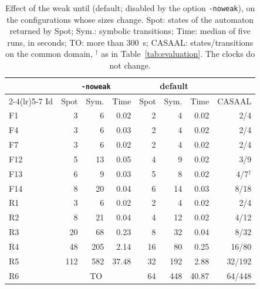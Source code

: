 \begin{table}[t]
\centering
\caption{Effect of the weak until (default; disabled by the option \texttt{-noweak}), on the configurations whose sizes change.  Spot: states of the automaton returned by Spot; Sym.: symbolic transitions; Time: median of five runs, in seconds; TO: more than 300~s; CASAAL: states/transitions on the common domain, $^\dagger$ as in Table~\ref{tab:evaluation}.  The clocks do not change.}
\label{tab:weak}
\footnotesize
\setlength{\tabcolsep}{3pt}
\begin{tabular}{@{}lrrrrrrr@{}}
\toprule
 & \multicolumn{3}{c}{\texttt{-noweak}} & \multicolumn{3}{c}{default} & \\
\cmidrule(lr){2-4}\cmidrule(lr){5-7}
Id & Spot & Sym. & Time & Spot & Sym. & Time & CASAAL\\
\midrule
F1 & 3 & 6 & 0.02 & 2 & 4 & 0.02 & 2/4\\
F4 & 3 & 6 & 0.03 & 2 & 4 & 0.02 & 2/4\\
F7 & 3 & 6 & 0.02 & 2 & 4 & 0.02 & 2/4\\
F12 & 5 & 13 & 0.05 & 4 & 9 & 0.02 & 3/9\\
F13 & 6 & 9 & 0.03 & 5 & 8 & 0.02 & 4/7$^\dagger$\\
F14 & 8 & 20 & 0.04 & 6 & 14 & 0.03 & 8/18\\
R1 & 3 & 6 & 0.02 & 2 & 4 & 0.02 & 2/4\\
R2 & 8 & 21 & 0.04 & 4 & 12 & 0.02 & 4/12\\
R3 & 20 & 68 & 0.23 & 8 & 32 & 0.04 & 8/32\\
R4 & 48 & 205 & 2.14 & 16 & 80 & 0.25 & 16/80\\
R5 & 112 & 582 & 37.48 & 32 & 192 & 2.88 & 32/192\\
R6 & \multicolumn{3}{c}{TO} & 64 & 448 & 40.87 & 64/448\\
\bottomrule
\end{tabular}
\end{table}
